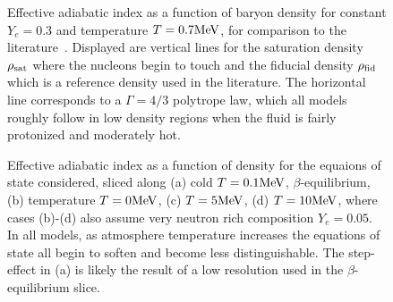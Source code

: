 \begin{figure}
	\centering
	
	\caption[Adiabatic index vs. density for constant composition and temperature]
	{
		Effective adiabatic index as a function of baryon density for constant $Y_e = 0.3$ and temperature $T = 0.7 {\rm MeV}$, for comparison to the literature~\cite{Fischer2014}.  Displayed are vertical lines for the saturation density $\rho_{\rm sat}$ where the nucleons begin to touch and the fiducial density $\rho_{\rm fid}$ which is a reference density used in the literature.  The horizontal line corresponds to a $\Gamma = 4/3$ polytrope law, which all models roughly follow in low density regions when the fluid is fairly protonized and moderately hot.
	}
	\label{fig:OneGammavsRho}
\end{figure}


\begin{figure}[]
	\centering
	\footnotesize{	
		
	}
	\caption[Adiabatic index vs. density for constant $Y_e = 0.3$, varying temperature]
	{
		Effective adiabatic index as a function of density for the equaions of state considered, sliced along 
		(a) cold $T=0.1 {\rm MeV}$, $\beta$-equilibrium,
		(b) temperature $T=0 {\rm MeV}$,
		(c) $T=5{\rm MeV}$,
		(d) $T=10{\rm MeV}$,
		where cases (b)-(d) also assume very neutron rich composition $Y_e = 0.05$.  In all models, as atmosphere temperature increases the equations of state all begin to soften and become less distinguishable.  
		The step-effect in (a) is likely the result of a low resolution used in the $\beta$-equilibrium slice. 
	}
	\label{fig:MultGammavsRho}
\end{figure}
